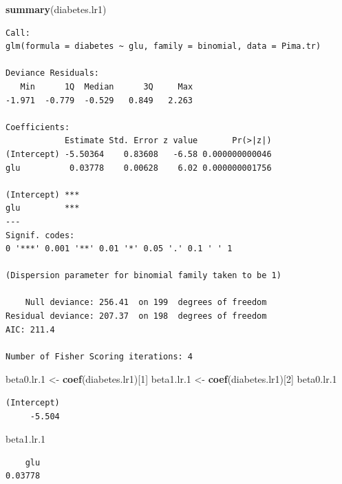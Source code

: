 \documentclass[
]{krantz}
\makeatletter
\newenvironment{Shaded}{\begin{snugshade}}{\end{snugshade}}
\newcommand{\DecValTok}[1]{\textcolor[rgb]{0.06,0.06,0.06}{#1}}
\newcommand{\FloatTok}[1]{\textcolor[rgb]{0.06,0.06,0.06}{#1}}
\newcommand{\KeywordTok}[1]{\textcolor[rgb]{0.27,0.27,0.27}{\textbf{#1}}}
\newcommand{\NormalTok}[1]{#1}
\newcommand{\StringTok}[1]{\textcolor[rgb]{0.5,0.5,0.5}{#1}}
\newenvironment{kframe}{%
\medskip{}
\setlength{\fboxsep}{.8em}
 \def\at@end@of@kframe{}%
 \ifinner\ifhmode%
  \def\at@end@of@kframe{\end{minipage}}%
  \begin{minipage}{\columnwidth}%
 \fi\fi%
 \def\FrameCommand##1{\hskip\@totalleftmargin \hskip-\fboxsep
 \colorbox{shadecolor}{##1}\hskip-\fboxsep
     \hskip-\linewidth \hskip-\@totalleftmargin \hskip\columnwidth}%
 \MakeFramed {\advance\hsize-\width
   \@totalleftmargin\z@ \linewidth\hsize
   \@setminipage}}%
 {\par\unskip\endMakeFramed%
 \at@end@of@kframe}
\renewenvironment{Shaded}{\begin{kframe}}{\end{kframe}}
\makeatother
\begin{document}
\begin{Shaded}
\begin{Highlighting}[]
\KeywordTok{summary}\NormalTok{(diabetes.lr1)}
\end{Highlighting}
\end{Shaded}

\begin{verbatim}
Call:
glm(formula = diabetes ~ glu, family = binomial, data = Pima.tr)

Deviance Residuals: 
   Min      1Q  Median      3Q     Max  
-1.971  -0.779  -0.529   0.849   2.263  

Coefficients:
            Estimate Std. Error z value       Pr(>|z|)
(Intercept) -5.50364    0.83608   -6.58 0.000000000046
glu          0.03778    0.00628    6.02 0.000000001756
               
(Intercept) ***
glu         ***
---
Signif. codes:  
0 '***' 0.001 '**' 0.01 '*' 0.05 '.' 0.1 ' ' 1

(Dispersion parameter for binomial family taken to be 1)

    Null deviance: 256.41  on 199  degrees of freedom
Residual deviance: 207.37  on 198  degrees of freedom
AIC: 211.4

Number of Fisher Scoring iterations: 4
\end{verbatim}

\begin{Shaded}
\begin{Highlighting}[]
\NormalTok{beta0.lr}\FloatTok{.1}\NormalTok{ \textless{}{-}}\StringTok{ }\KeywordTok{coef}\NormalTok{(diabetes.lr1)[}\DecValTok{1}\NormalTok{]}
\NormalTok{beta1.lr}\FloatTok{.1}\NormalTok{ \textless{}{-}}\StringTok{ }\KeywordTok{coef}\NormalTok{(diabetes.lr1)[}\DecValTok{2}\NormalTok{]}
\NormalTok{beta0.lr}\FloatTok{.1}
\end{Highlighting}
\end{Shaded}

\begin{verbatim}
(Intercept) 
     -5.504 
\end{verbatim}

\begin{Shaded}
\begin{Highlighting}[]
\NormalTok{beta1.lr}\FloatTok{.1}
\end{Highlighting}
\end{Shaded}

\begin{verbatim}
    glu 
0.03778 
\end{verbatim}
\end{document}
